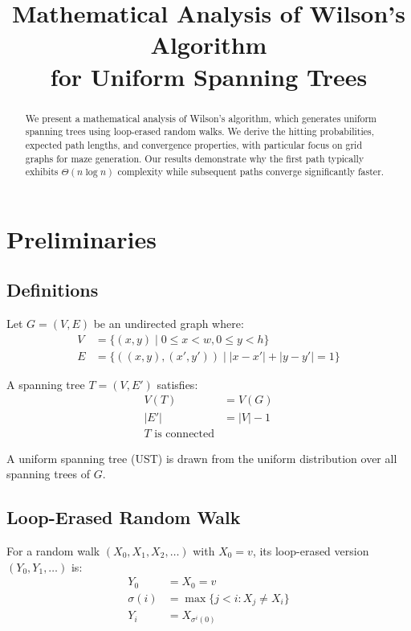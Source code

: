 \documentclass[twocolumn,10pt]{article}
\title{Mathematical Analysis of Wilson's Algorithm\\for Uniform Spanning Trees}
\author{}
\date{}
\begin{document}
\maketitle

\begin{abstract}
We present a mathematical analysis of Wilson's algorithm, which generates uniform spanning trees using loop-erased random walks. We derive the hitting probabilities, expected path lengths, and convergence properties, with particular focus on grid graphs for maze generation. Our results demonstrate why the first path typically exhibits $\Theta(n\log n)$ complexity while subsequent paths converge significantly faster.
\end{abstract}

\section{Preliminaries}

\subsection{Definitions}

Let $G = (V, E)$ be an undirected graph where:
\begin{align}
V &= \{(x, y) \mid 0 \leq x < w, 0 \leq y < h\}\\
E &= \{((x, y), (x', y')) \mid |x - x'| + |y - y'| = 1\}
\end{align}

A spanning tree $T = (V, E')$ satisfies:
\begin{align}
V(T) &= V(G)\\
|E'| &= |V| - 1\\
T \text{ is connected}
\end{align}

A uniform spanning tree (UST) is drawn from the uniform distribution over all spanning trees of $G$.

\subsection{Loop-Erased Random Walk}

For a random walk $(X_0, X_1, X_2, \ldots)$ with $X_0 = v$, its loop-erased version $(Y_0, Y_1, \ldots)$ is:
\begin{align}
Y_0 &= X_0 = v\\
\sigma(i) &= \max\{j < i : X_j \neq X_i\}\\
Y_i &= X_{\sigma^i(0)}
\end{align}
\end{document}
